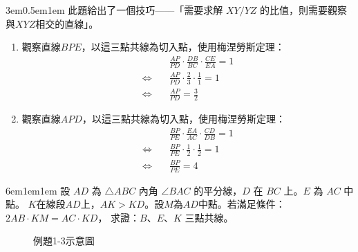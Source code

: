 \documentclass[12pt]{article}
\begin{document}
\begin{mybox}[解]{3em}{0.5em}{1em}
    此題給出了一個技巧——「需要求解 $XY/YZ$ 的比值，則需要觀察與$XYZ$相交的直線」。
    \begin{enumerate}[label=(\roman*)]
        \item 觀察直線$BPE$，以這三點共線為切入點，使用梅涅勞斯定理：
        \begin{align*}
            &\frac{AP}{PD}\cdot\frac{DB}{BC}\cdot\frac{CE}{EA}=1\\
            \Leftrightarrow\quad&\frac{AP}{PD}\cdot\frac{2}{3}\cdot\frac{1}{1}=1\\
            \Leftrightarrow\quad&\frac{AP}{PD}=\frac{3}{2}
        \end{align*}
        \item 觀察直線$APD$，以這三點共線為切入點，使用梅涅勞斯定理：
        \begin{align*}
            &\frac{BP}{PE}\cdot\frac{EA}{AC}\cdot\frac{CD}{DB}=1\\
            \Leftrightarrow\quad&\frac{BP}{PE}\cdot\frac{1}{2}\cdot\frac{1}{2}=1\\
            \Leftrightarrow\quad&\frac{BP}{PE}=4
        \end{align*}
    \end{enumerate}
\end{mybox}
\newpage
\begin{mybox}[例題\thesection-3]{6em}{1em}{1em}
    設 $AD$ 為 $\triangle ABC$ 內角 $\angle BAC$ 的平分線，$D$ 在 $BC$ 上。$E$ 為 $AC$ 中點。
    $K$在線段$AD$上，$AK>KD$。設$M$為$AD$中點。若滿足條件：$2AB \cdot KM = AC \cdot KD$，
    求證：$B$、$E$、$K$ 三點共線。
    \begin{figure}[H]
        \centering 
        \caption{例題1-3示意圖}
        \label{fig:coline_s1-5}
    \end{figure}
\end{mybox}
\end{document}
